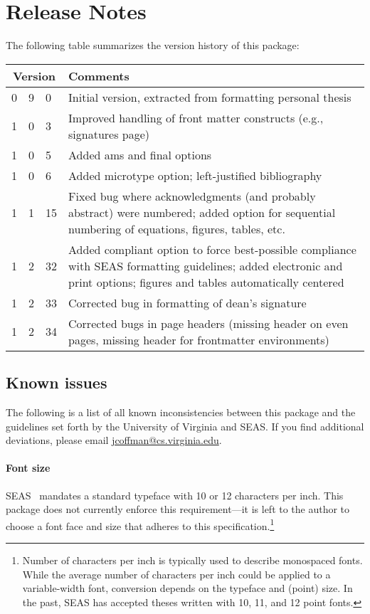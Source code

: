 \documentclass[10pt]{article}
\newcommand{\option}[1]{#1}
\begin{document}


\section{Release Notes}\label{section:release notes}
The following table summarizes the version history of this package:
\begin{longtable}{r@{.}r@{.}l p{.8\linewidth}}
  \multicolumn{3}{c}{Version} & Comments\\
  \midrule
  0	& 9	& 0	& Initial version, extracted from formatting personal thesis\\[2ex] %
  1	& 0	& 3	& Improved handling of front matter constructs (e.g., signatures page)\\
  1	& 0	& 5	& Added \option{ams} and \option{final} options\\
  1	& 0	& 6	& Added \option{microtype} option; left-justified bibliography\\
  1	& 1	& 15	& Fixed bug where acknowledgments (and probably abstract) were numbered; added option for sequential numbering of equations, figures, tables, etc.\\
  1	& 2	& 32 	& Added \option{compliant} option to force best-possible compliance with \gls{SEAS} formatting guidelines; added \option{electronic} and \option{print} options; figures and tables automatically centered\\
  1	& 2	& 33	& Corrected bug in formatting of dean's signature\\
  1	& 2	& 34	& Corrected bugs in page headers (missing header on even pages, missing header for frontmatter environments)\\
\end{longtable}

\subsection*{Known issues}
The following is a list of all known inconsistencies between this package and the guidelines set forth by the University of Virginia and \gls{SEAS}.
If you find additional deviations, please email \url{jcoffman@cs.virginia.edu}.

\paragraph{Font size}
\Gls{SEAS}~\cite{seas:instructions} mandates a standard typeface with 10 or 12 characters per inch.
This package does not currently enforce this requirement---it is left to the author to choose a font face and size that adheres to this specification.\footnote{
  Number of characters per inch is typically used to describe monospaced fonts.
  While the average number of characters per inch could be applied to a variable-width font, conversion depends on the typeface and (point) size.
  In the past, \Gls{SEAS} has accepted theses written with 10, 11, and 12 point fonts.
}
\end{document}
